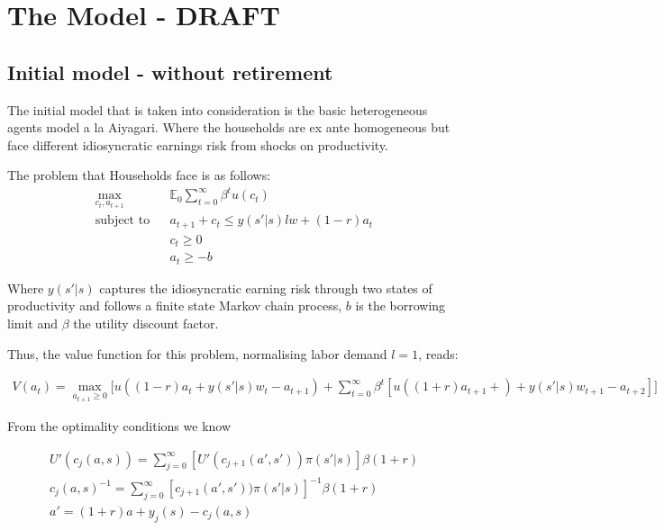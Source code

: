 \documentclass[12pt]{article}
\begin{document}
\section{The Model  - DRAFT}
\subsection{Initial model - without retirement}
The initial model that is taken into consideration is the basic heterogeneous agents model a la Aiyagari. Where the households are ex ante homogeneous but face different idiosyncratic earnings risk from shocks on productivity.

The problem that Households face is as follows:
\begin{align*}
&\max_{c_t,a_{t+1}}&&\mathbb{E}_0 \sum_{t=0}^{\infty} \beta^t u(c_t) &\\
&\text{subject to}&&a_{t+1} + c_t \le y(s'|s)lw +(1-r)a_t & \\
&&&c_t\ge 0 \\
&&&a_t \ge -b
\end{align*}

Where $y(s'|s)$ captures the idiosyncratic earning risk through two states of productivity and follows a finite state Markov chain process, $b$ is the borrowing limit and $\beta$ the utility discount factor.

Thus, the value function for this problem, normalising labor demand $l=1$, reads:

\begin{align*}
V(a_t)=\max_{a_{t+1}\ge 0} \big[ u((1-r)a_t + y(s'|s)w_t -a_{t+1}) + \sum_{t=0}^{\infty}\beta^t [u((1+r)a_{t+1}+)+ y(s'|s)w_{t+1} -a_{t+2}]\big]
\end{align*}

From the optimality conditions we know 

\begin{align*}
U'(c_j(a,s)) = \displaystyle\sum_{j=0}^{\infty} [U'(c_{j+1}(a',s'))\pi(s'| s)]   \beta(1+r) \\
c_j(a,s)^{-1} = \displaystyle\sum_{j=0}^{\infty} [c_{j+1}(a',s'))\pi(s'| s)]^{-1} \beta(1+r) \\
a'=(1+r)a+y_j(s)-c_j(a,s) \\
\end{align*}
\end{document}
